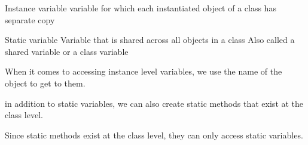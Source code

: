 Instance variable 
  variable for which each instantiated object of a class has separate copy 

Static variable 
  Variable that is shared across all objects in a class
  Also called a shared variable or a class variable 

When it comes to accessing instance level variables, we use the name of the object to get to them.

in addition to static variables, we can also create static methods that exist at the class level. 

Since static methods exist at the class level, they can only access static variables.